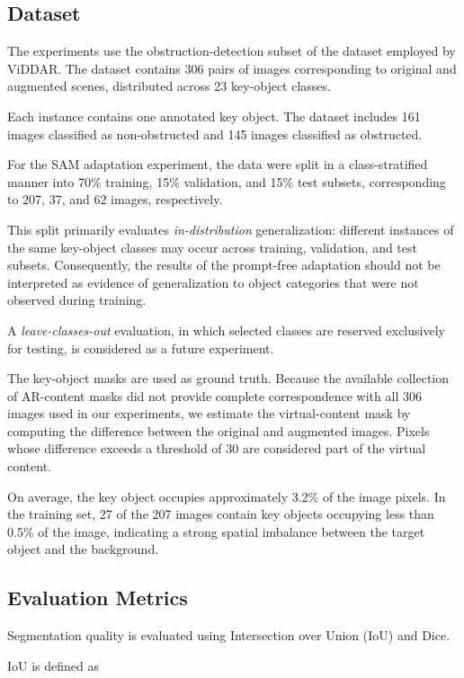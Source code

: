 \documentclass[conference]{IEEEtran}
\begin{document}
\subsection{Dataset}

The experiments use the obstruction-detection subset of the dataset employed by ViDDAR. The dataset contains 306 pairs of images corresponding to original and augmented scenes, distributed across 23 key-object classes.

Each instance contains one annotated key object. The dataset includes 161 images classified as non-obstructed and 145 images classified as obstructed.

For the SAM adaptation experiment, the data were split in a class-stratified manner into 70\% training, 15\% validation, and 15\% test subsets, corresponding to 207, 37, and 62 images, respectively.

This split primarily evaluates \textit{in-distribution} generalization: different instances of the same key-object classes may occur across training, validation, and test subsets. Consequently, the results of the prompt-free adaptation should not be interpreted as evidence of generalization to object categories that were not observed during training.

A \textit{leave-classes-out} evaluation, in which selected classes are reserved exclusively for testing, is considered as a future experiment.

The key-object masks are used as ground truth. Because the available collection of AR-content masks did not provide complete correspondence with all 306 images used in our experiments, we estimate the virtual-content mask by computing the difference between the original and augmented images. Pixels whose difference exceeds a threshold of 30 are considered part of the virtual content.

On average, the key object occupies approximately 3.2\% of the image pixels. In the training set, 27 of the 207 images contain key objects occupying less than 0.5\% of the image, indicating a strong spatial imbalance between the target object and the background.


\subsection{Evaluation Metrics}

Segmentation quality is evaluated using Intersection over Union (IoU) and Dice.

IoU is defined as
\end{document}
